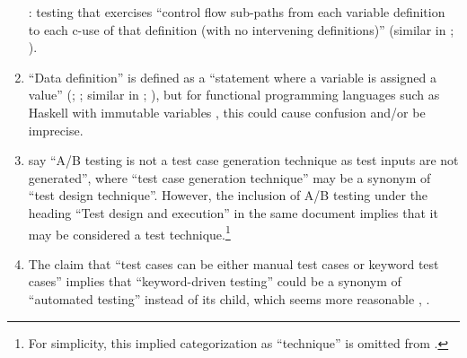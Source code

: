 \begin{enumerate}
          \citeyearpar[p.~27]{IEEE2021}: testing that exercises ``control flow
          sub-paths from each variable definition to each \acs{c-use} of that
          definition (with no intervening definitions)'' (similar in
          \citealp[p.~425]{vanVliet2000}; \citealp[p.~479]{PetersAndPedrycz2000}).
    \item %
          ``Data definition'' is defined as a ``statement where a variable is
          assigned a value'' (\citealp[p.~3]{IEEE2021}; \citeyear[p.~115]{IEEE2017}%
          ; similar in \citeyear[p.~27]{IEEE2012};
          \citealp[p.~424]{vanVliet2000}), but for functional programming
          languages such as Haskell with immutable variables
          \citep{WikiHaskell2023}, this could cause confusion and/or be
          imprecise.
    \item %
           \citet[p.~36]{IEEE2022} say ``A/B testing is not a test
          case generation technique as test inputs are not generated'', where
          ``test case generation technique'' may be a synonym of ``test design
          technique''. However, the inclusion of A/B testing under the heading
          ``Test design and execution'' in the same document implies that it
          may be considered a test technique.\footnote{For simplicity, this
              implied categorization as ``technique'' is omitted from
              .}
    \item %
          The claim that ``test cases can be either manual test cases or
          keyword test cases'' \citep[p.~6]{IEEE2016} implies that ``keyword-driven
          testing'' could be a synonym of ``automated testing'' instead of its
          child, which seems more reasonable \ifnotpaper
              \citetext{\citeyear[p.~4]{IEEE2016}; \citeyear[p.~35]{IEEE2022}}%
          \else\cite[p.~35]{IEEE2022}, \cite[p.~4]{IEEE2016}\fi.


\end{enumerate}

